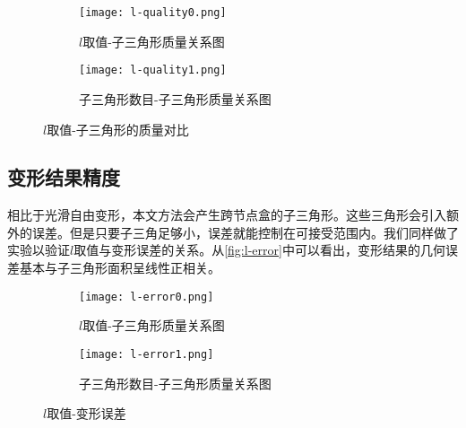 \begin{figure}[htbp]
	\centering
	\begin{subfigure}[b]{.45\textwidth}
		\centering
		\texttt{[image: l-quality0.png]}
		\caption{$l$取值-子三角形质量关系图}\label{subfig:l-quality0}
	\end{subfigure}%
	\begin{subfigure}[b]{.45\textwidth}
		\centering
		\texttt{[image: l-quality1.png]}
		\caption{子三角形数目-子三角形质量关系图}\label{subfig:l-quality1}
	\end{subfigure}
	\caption{$l$取值-子三角形的质量对比}\label{fig:l-quality}
\end{figure}

\subsection{变形结果精度}
相比于光滑自由变形，本文方法会产生跨节点盒的子三角形。这些三角形会引入额外的误差。但是只要子三角足够小，误差就能控制在可接受范围内。我们同样做了实验以验证$l$取值与变形误差的关系。从\autoref{fig:l-error}中可以看出，变形结果的几何误差基本与子三角形面积呈线性正相关。
\begin{figure}[htbp]
	\centering
	\begin{subfigure}[b]{.45\textwidth}
		\centering
		\texttt{[image: l-error0.png]}
		\caption{$l$取值-子三角形质量关系图}\label{subfig:l-error0}
	\end{subfigure}%
	\begin{subfigure}[b]{.45\textwidth}
		\centering
		\texttt{[image: l-error1.png]}
		\caption{子三角形数目-子三角形质量关系图}\label{subfig:l-error1}
	\end{subfigure}
	\caption{$l$取值-变形误差}\label{fig:l-error}
\end{figure}

